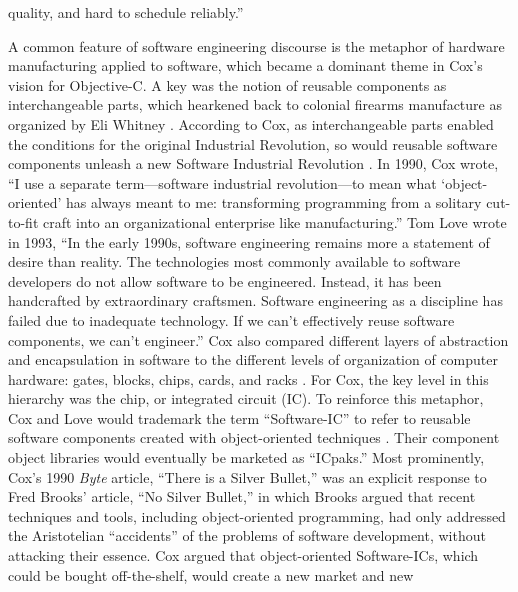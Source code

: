 \documentclass[acmsmall]{acmart}\settopmatter{}
\begin{document}
quality, and hard to schedule reliably.'' \citep[307]{ledbetter_software-ics:_1985} 

A common feature of software engineering discourse is the metaphor of hardware manufacturing applied to software, which became a dominant theme in Cox's vision for Objective-C. A key was the notion of reusable components as interchangeable parts, which hearkened back to colonial firearms manufacture as organized by Eli Whitney \citetext{\citealp[26]{cox_planning_1990}; \citealp[214]{cox_there_1990}; \citealp[1]{cox_object-oriented_1986}; \citealp[1]{cox_object-oriented_1991}}. According to Cox, as interchangeable parts enabled the conditions for the original Industrial Revolution, so would reusable software components unleash a new Software Industrial Revolution \citetext{\citealp{cox_planning_1990}; \citealp[214]{cox_there_1990}}. In 1990, Cox wrote, ``I use a separate term---software industrial revolution---to mean what `object-oriented' has always meant to me: transforming programming from a solitary cut-to-fit craft into an organizational enterprise like manufacturing.'' \citep[27]{cox_planning_1990} Tom Love wrote in 1993, ``In the early 1990s, software engineering remains more a statement of desire than reality. The technologies most commonly available to software developers do not allow software to be engineered. Instead, it has been handcrafted by extraordinary craftsmen.\textellipsis{} Software engineering as a discipline has failed due to inadequate technology. If we can't effectively reuse software components, we can't engineer.'' \citep[21]{love_object_1995} Cox also compared different layers of abstraction and encapsulation in software to the different levels of organization of computer hardware: gates, blocks, chips, cards, and racks \citetext{\citealp[29]{cox_planning_1990}; \citealp[212]{cox_there_1990}; \citealp[50]{cox_object-oriented_1991}}.  For Cox, the key level in this hierarchy was the chip, or integrated circuit (IC). To reinforce this metaphor, Cox and Love would trademark the term ``Software-IC'' to refer to reusable software components created with object-oriented techniques \citetext{\citealp[166]{cox_objective-c_1988}; \citealp[331]{cox_planning_1989}; \citealp[2, 9, 19, 26, 53, 68, 70, 78, 88, 91, 96, 104, 156, 215]{cox_object-oriented_1986}; \citealp[19--20, 26--28, 69, 74--75, 90--92, 118, 174, 217]{cox_object-oriented_1991}; \citealp{cox_objects_1986}; \citealp{ledbetter_software-ics:_1985}; \citealp[240--41]{love_economics_1988}}. Their component object libraries would eventually be marketed as ``ICpaks.'' \citetext{\citealp[166, 168]{cox_objective-c_1988}; \citealp[174, 179, 181, 185, 188, 194]{cox_object-oriented_1991}; \citealp[239--41]{love_economics_1988}} Most prominently, Cox's 1990 \emph{Byte} article, ``There is a Silver Bullet,'' \citep{cox_there_1990} was an explicit response to Fred Brooks' \citeyear{brooks_no_1987} article, ``No Silver Bullet,'' in which Brooks argued that recent techniques and tools, including object-oriented programming, had only addressed the Aristotelian ``accidents'' of the problems of software development, without attacking their essence. Cox argued that object-oriented Software-ICs, which could be bought off-the-shelf, would create a new market and new 
\end{document}
